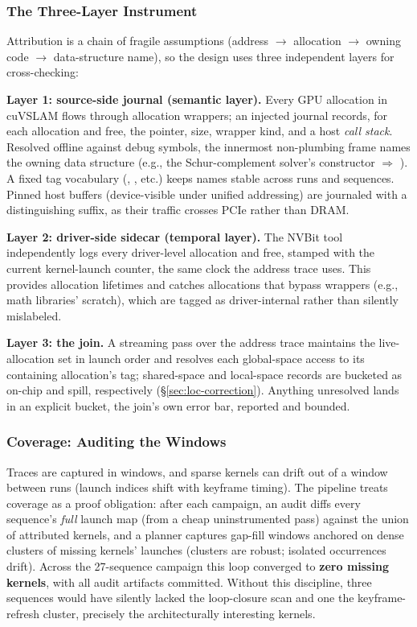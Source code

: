 \subsubsection{The Three-Layer Instrument}
\label{sec:attr-design}

Attribution is a chain of fragile assumptions (address $\rightarrow$ allocation $\rightarrow$ owning code $\rightarrow$ data-structure name), so the design uses three independent layers for cross-checking:

 \textbf{Layer 1: source-side journal (semantic layer).} Every GPU allocation in cuVSLAM flows through allocation wrappers; an injected journal records, for each allocation and free, the pointer, size, wrapper kind, and a host \emph{call stack}. Resolved offline against debug symbols, the innermost non-plumbing frame names the owning data structure (e.g., the Schur-complement solver’s constructor $\Rightarrow$ ). A fixed tag vocabulary (, , etc.) keeps names stable across runs and sequences. Pinned host buffers (device-visible under unified addressing) are journaled with a distinguishing suffix, as their traffic crosses PCIe rather than DRAM.

\textbf{Layer 2: driver-side sidecar (temporal layer).} The NVBit tool independently logs every driver-level allocation and free, stamped with the current kernel-launch counter, the same clock the address trace uses. This provides allocation lifetimes and catches allocations that bypass wrappers (e.g., math libraries’ scratch), which are tagged as driver-internal rather than silently mislabeled.

\textbf{Layer 3: the join.} A streaming pass over the address trace maintains the live-allocation set in launch order and resolves each global-space access to its containing allocation’s tag; shared-space and local-space records are bucketed as on-chip and spill, respectively (\S\ref{sec:loc-correction}). Anything unresolved lands in an explicit  bucket, the join’s own error bar, reported and bounded.

\subsubsection{Coverage: Auditing the Windows}
\label{sec:attr-coverage}

Traces are captured in windows, and sparse kernels can drift out of a window between runs (launch indices shift with keyframe timing). The pipeline treats coverage as a proof obligation: after each campaign, an audit diffs every sequence’s \emph{full} launch map (from a cheap uninstrumented pass) against the union of attributed kernels, and a planner captures gap-fill windows anchored on dense clusters of missing kernels’ launches (clusters are robust; isolated occurrences drift). Across the 27-sequence campaign this loop converged to \textbf{zero missing kernels}, with all audit artifacts committed. Without this discipline, three sequences would have silently lacked the loop-closure scan and one the keyframe-refresh cluster, precisely the architecturally interesting kernels.

